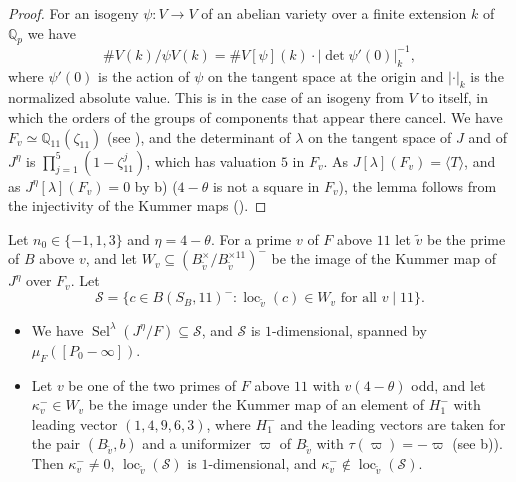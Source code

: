 \documentclass[11pt,reqno]{amsart}
\DeclareMathOperator{\Sel}{Sel}
\DeclareMathOperator{\loc}{loc}
\newcommand{\Q}{\mathbb{Q}}
\theoremstyle{definition}
\numberwithin{equation}{section}
\begin{document}
\begin{proof}
For an isogeny $\psi\colon V\rightarrow V$ of an abelian variety over a finite extension $k$ of $\Q_p$ we have
$$\#V(k)/\psi V(k)=\#V[\psi](k)\cdot |\det \psi'(0)|_k^{-1},$$
where $\psi'(0)$ is the action of $\psi$ on the tangent space at the origin and $|\cdot|_k$ is the normalized absolute value. This is \cite[Lemma 3.8]{Schaefer96} in the case of an isogeny from $V$ to itself, in which the orders of the groups of components that appear there cancel. We have $F_v\simeq\Q_{11}(\zeta_{11})$ (see ), and the determinant of $\lambda$ on the tangent space of $J$ and of $J^\eta$ is $\prod_{j=1}^5(1-\zeta_{11}^j)$, which has valuation $5$ in $F_v$. As $J[\lambda](F_v)=\langle T\rangle$, and as $J^\eta[\lambda](F_v)=0$ by  b) ($4-\theta$ is not a square in $F_v$), the lemma follows from the injectivity of the Kummer maps ().
\end{proof}

\begin{proposition}\label{prop:odd_selmer}
Let $n_0\in\{-1,1,3\}$ and $\eta=4-\theta$. For a prime $v$ of $F$ above $11$ let $\tilde v$ be the prime of $B$ above $v$, and let $W_v\subseteq (B_{\tilde v}^\times/B_{\tilde v}^{\times 11})^-$ be the image of the Kummer map of $J^\eta$ over $F_v$. Let
$$\mathcal S=\{c\in B(S_B,11)^- : \loc_{\tilde v}(c)\in W_v \text{ for all } v\mid 11\}.$$
\begin{itemize}
\item[a)] We have $\Sel^\lambda(J^\eta/F)\subseteq\mathcal S$, and $\mathcal S$ is $1$-dimensional, spanned by $\mu_F([P_0-\infty])$.
\item[b)] Let $v$ be one of the two primes of $F$ above $11$ with $v(4-\theta)$ odd, and let $\kappa_v^-\in W_v$ be the image under the Kummer map of an element of $H_1^-$ with leading vector $(1,4,9,6,3)$, where $H_1^-$ and the leading vectors are taken for the pair $(B_{\tilde v},b)$ and a uniformizer $\varpi$ of $B_{\tilde v}$ with $\tau(\varpi)=-\varpi$ (see  b)). Then $\kappa_v^-\neq 0$, $\loc_{\tilde v}(\mathcal S)$ is $1$-dimensional, and $\kappa_v^-\notin\loc_{\tilde v}(\mathcal S)$.
\end{itemize}
\end{proposition}
\end{document}

